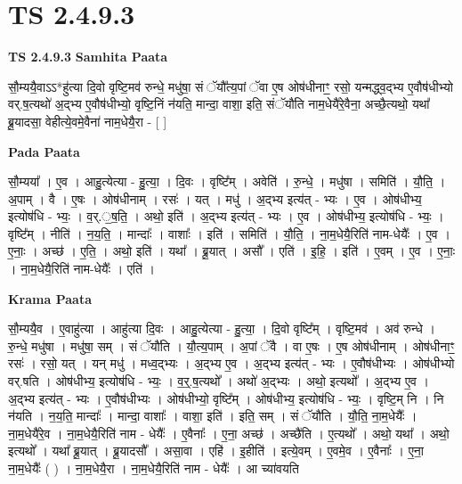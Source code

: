 \documentclass[17pt]{extarticle}
\begin{document}
\section*{ TS 2.4.9.3 }

\textbf{TS 2.4.9.3 } \newline
\textbf{Samhita Paata} \newline

सौ॒म्ययै॒वाऽऽ*हु॑त्या दि॒वो वृष्टि॒मव॑ रुन्धे॒ मधु॑षा॒ सं ॅयौ᳚त्य॒पां ॅवा ए॒ष ओष॑धीनाꣳ॒॒ रसो॒ यन्मद्ध्व॒द्भ्य ए॒वौष॑धीभ्यो वर्.ष॒त्यथो॑ अ॒द्भ्य ए॒वौष॑धीभ्यो॒ वृष्टि॒निं न॑यति॒ मान्दा॒ वाशा॒ इति॒ संॅयौ॑ति नाम॒धेयै॑रे॒वैना॒ अच्छै॒त्यथो॒ यथा᳚ ब्रू॒यादसा॒ वेहीत्ये॒वमे॒वैना॑ नाम॒धेयै॒रा - [  ] \newline

\textbf{Pada Paata} \newline

सौ॒म्यया᳚ । ए॒व । आहु॒त्येत्या - हु॒त्या॒ । दि॒वः । वृष्टि᳚म् । अवेति॑ । रु॒न्धे॒ । मधु॑षा । समिति॑ । यौ॒ति॒ । अ॒पाम् । वै । ए॒षः । ओष॑धीनाम् । रसः॑ । यत् । मधु॑ । अ॒द्भ्य इत्य॑त् - भ्यः । ए॒व । ओष॑धीभ्य॒ इत्योष॑धि - भ्यः॒ । व॒र्.॒ष॒ति॒ । अथो॒ इति॑ । अ॒द्भ्य इत्य॑त् - भ्यः । ए॒व । ओष॑धीभ्य॒ इत्योष॑धि - भ्यः॒ । वृष्टि᳚म् । नीति॑ । न॒य॒ति॒ । मान्दाः᳚ । वाशाः᳚ । इति॑ । समिति॑ । यौ॒ति॒ । ना॒म॒धेयै॒रिति॑ नाम-धेयैः᳚ । ए॒व । ए॒नाः॒ । अच्छ॑ । ए॒ति॒ । अथो॒ इति॑ । यथा᳚ । ब्रू॒यात् । असौ᳚ ।   एति॑ । इ॒हि॒ । इति॑ । ए॒वम् । ए॒व । ए॒नाः॒ । ना॒म॒धेयै॒रिति॑ नाम-धेयैः᳚ । एति॑ ।  \newline


\textbf{Krama Paata} \newline

सौ॒म्ययै॒व । ए॒वाहु॑त्या । आहु॑त्या दि॒वः । आहु॒त्येत्या - हु॒त्या॒ । दि॒वो वृष्टि᳚म् । वृष्टि॒मव॑ । अव॑ रुन्धे । रु॒न्धे॒ मधु॑षा । मधु॑षा॒ सम् । सं ॅयौ॑ति । यौ॒त्य॒पाम् । अ॒पां ॅवै । वा ए॒षः । ए॒ष ओष॑धीनाम् । ओष॑धीनाꣳ॒॒ रसः॑ । रसो॒ यत् । यन् मधु॑ । मध्व॒द्भ्यः । अ॒द्भ्य ए॒व । अ॒द्भ्य इत्य॑त् - भ्यः । ए॒वौष॑धीभ्यः । ओष॑धीभ्यो वर्.षति । ओष॑धीभ्य॒ इत्योष॑धि - भ्यः॒ । व॒र्॒.ष॒त्यथो᳚ । अथो॑ अ॒द्भ्यः । अथो॒ इत्यथो᳚ । अ॒द्भ्य ए॒व । अ॒द्भ्य इत्य॑त् - भ्यः । ए॒वौष॑धीभ्यः । ओष॑धीभ्यो॒ वृष्टि᳚म् । ओष॑धीभ्य॒ इत्योष॑धि - भ्यः॒ । वृष्टि॒म् नि । नि न॑यति । न॒य॒ति॒ मान्दाः᳚ । मान्दा॒ वाशाः᳚ । वाशा॒ इति॑ । इति॒ सम् । सं ॅयौ॑ति । यौ॒ति॒ ना॒म॒धेयैः᳚ । ना॒म॒धेयै॑रे॒व । ना॒म॒धेयै॒रिति॑ नाम - धेयैः᳚ । ए॒वैनाः᳚ । ए॒ना॒ अच्छ॑ । अच्छै॑ति । ए॒त्यथो᳚ । अथो॒ यथा᳚ । अथो॒ इत्यथो᳚ । यथा᳚ ब्रू॒यात् । ब्रू॒यादसौ᳚ । असा॒वा । एहि॑ । इ॒हीति॑ । इत्ये॒वम् । ए॒वमे॒व । ए॒वैनाः᳚ । ए॒ना॒ ना॒म॒धेयैः᳚ ( ) । ना॒म॒धेयै॒रा । ना॒म॒धेयै॒रिति॑ नाम - धेयैः᳚ । आ च्या॑वयति \newline
\end{document}
